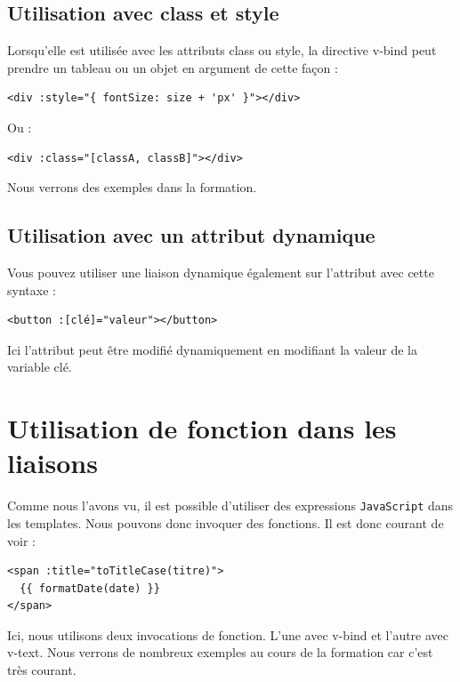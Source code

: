 \documentclass{article}
\begin{document}
\subsection{Utilisation avec class et style}
Lorsqu'elle est utilisée avec les attributs class ou style, la directive v-bind peut prendre un tableau ou un objet en argument de cette façon :
\begin{verbatim}
<div :style="{ fontSize: size + 'px' }"></div>
\end{verbatim}
Ou :
\begin{verbatim}
<div :class="[classA, classB]"></div>
\end{verbatim}

Nous verrons des exemples dans la formation.

\subsection{Utilisation avec un attribut dynamique}
Vous pouvez utiliser une liaison dynamique également sur l'attribut avec cette syntaxe :
\begin{verbatim}
<button :[clé]="valeur"></button>
\end{verbatim}
Ici l'attribut peut être modifié dynamiquement en modifiant la valeur de la variable clé.


\section{Utilisation de fonction dans les liaisons}
Comme nous l'avons vu, il est possible d'utiliser des expressions {\tt JavaScript} dans les templates. Nous pouvons donc invoquer des fonctions. Il est donc courant de voir :
\begin{verbatim}
<span :title="toTitleCase(titre)">
  {{ formatDate(date) }}
</span>
\end{verbatim}

Ici, nous utilisons deux invocations de fonction. L'une avec {\color{monOrange}v-bind} et l'autre avec {\color{monOrange}v-text}. Nous verrons de nombreux exemples au cours de la formation car c'est très courant.
\end{document}
